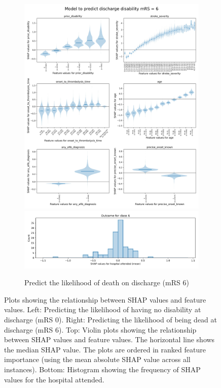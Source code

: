 \begin{figure}\ContinuedFloat
    \centering
    \begin{subfigure}{1\textwidth}
      \centering
      \includegraphics[trim={0 0 0 1.2cm}, clip, width=1\linewidth]{./images/053_xgb_7_features_1fold_999999_thrombolysis_shap_violin_all_features_for_mRS6}\\
      \includegraphics[trim={0 0 0 1cm}, clip, width=1\linewidth]    {./images/053_xgb_7_features_1fold_999999_hosp_shap_hist_mrs6}\\
      \caption{Predict the likelihood of death on discharge (mRS 6)}
      \label{fig:mrs_violin}
    \end{subfigure}%
  \caption{Plots showing the relationship between SHAP values and feature values. Left: Predicting the likelihood of having no disability at discharge (mRS 0). Right: Predicting the likelihood of being dead at discharge (mRS 6). Top: Violin plots showing the relationship between SHAP values and feature values. The horizontal line shows the median SHAP value. The plots are ordered in ranked feature importance (using the mean absolute SHAP value across all instances). Bottom: Histogram showing the frequency of SHAP values for the hospital attended.}
    \label{fig:scatter}
\end{figure}


